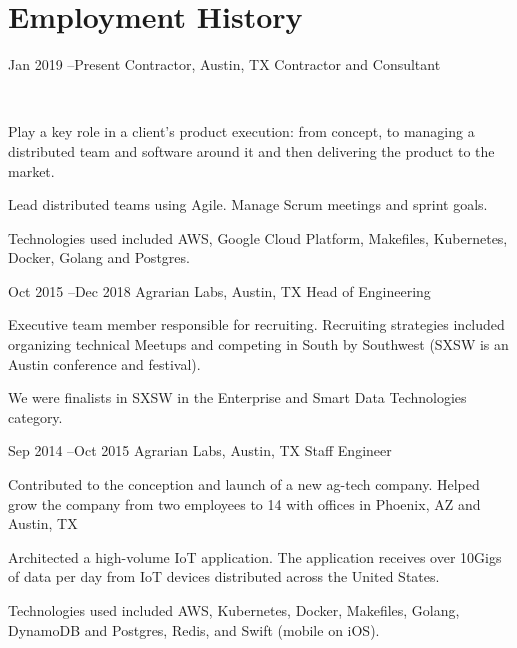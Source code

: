 \documentclass[10pt]{article} %
\begin{document}

\section{Employment History}

\job
{Jan 2019 --}{Present}
{Contractor, Austin, TX}
{}
{Contractor and Consultant}
{\\

\begin{itemize-noindent}
\item{Play a key role in a client's product execution: from concept, to managing a distributed team and software around it and then delivering the product to the market.}
\item{Lead distributed teams using Agile. Manage Scrum meetings and sprint goals.}
\item{Technologies used included AWS, Google Cloud Platform, Makefiles, Kubernetes, Docker, Golang and Postgres.}
\end{itemize-noindent}
}


\job
{Oct 2015 --}{Dec 2018}
{Agrarian Labs, Austin, TX}
{}
{Head of Engineering}
{

\begin{itemize-noindent}
\item{Executive team member responsible for recruiting. Recruiting strategies included organizing technical Meetups and competing in South by Southwest (SXSW is an Austin conference and festival).}
\item{We were finalists in SXSW in the Enterprise and Smart Data Technologies category.}
\end{itemize-noindent}
}



\job
{Sep 2014 --}{Oct 2015}
{Agrarian Labs, Austin, TX}
{}
{Staff Engineer}
{

\begin{itemize-noindent}
\item{Contributed to the conception and launch of a new ag-tech company.  Helped grow the company from two employees to 14 with offices in Phoenix, AZ and Austin, TX}
\item{Architected a high-volume IoT application.  The application receives over 10Gigs of data per day from IoT devices distributed across the United States.}
\item{Technologies used included AWS, Kubernetes, Docker, Makefiles, Golang, DynamoDB and Postgres, Redis, and Swift (mobile on iOS).}
\end{itemize-noindent}
}
\end{document}
